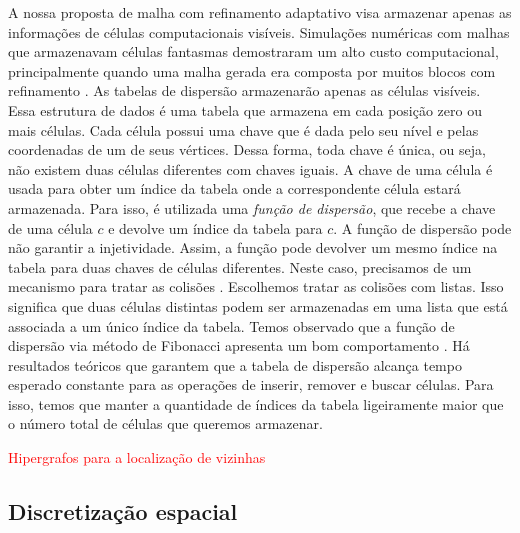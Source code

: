 \documentclass[12pt]{article}
\begin{document}
A nossa proposta de malha com refinamento adaptativo visa armazenar apenas as informações de células computacionais visíveis. Simulações numéricas com malhas que armazenavam células fantasmas demostraram um alto custo computacional, principalmente quando uma malha gerada era composta por muitos blocos com refinamento \cite{CAL12}.  As tabelas de dispersão armazenarão apenas as células visíveis. Essa estrutura de dados  é uma tabela que armazena em cada posição zero ou mais células. Cada célula possui uma chave que é dada pelo seu nível e pelas coordenadas de um de seus vértices. Dessa forma, toda chave é única, ou seja, não existem duas células diferentes com chaves iguais. A chave de uma célula é usada para obter um índice da tabela onde a correspondente célula estará armazenada. Para isso, é utilizada uma {\em função de dispersão}, que recebe a chave de uma célula $c$ e devolve um índice da tabela para $c$. A função de dispersão pode não garantir a injetividade. Assim,  a função pode devolver um mesmo índice na tabela para duas chaves de células diferentes. Neste caso, precisamos de um mecanismo para tratar as colisões \cite{GRI99,MUL12,SZW12}. Escolhemos tratar as colisões com listas. Isso significa que duas células distintas podem ser armazenadas em uma lista que está associada a um único índice da tabela. Temos observado que a função de dispersão via método de Fibonacci apresenta um bom comportamento \cite{KNU97}. Há resultados teóricos que garantem que a tabela de dispersão alcança tempo esperado constante para as operações de inserir, remover e buscar células. Para isso, temos que manter a quantidade de índices da tabela ligeiramente maior que o número total de células que queremos armazenar.

\textcolor{red}{Hipergrafos para a localização de vizinhas}


\subsection{Discretização espacial}
\end{document}
